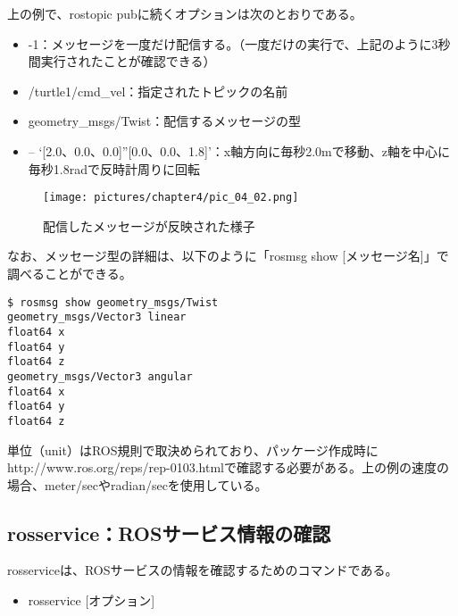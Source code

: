上の例で、rostopic pubに続くオプションは次のとおりである。

\begin{itemize}
\item -1：メッセージを一度だけ配信する。（一度だけの実行で、上記のように3秒間実行されたことが確認できる）
\item /turtle1/cmd\_vel：指定されたトピックの名前
\item geometry\_msgs/Twist：配信するメッセージの型
\item -- ‘[2.0、0.0、0.0]''[0.0、0.0、1.8]’：x軸方向に毎秒2.0mで移動、z軸を中心に毎秒1.8radで反時計周りに回転
\end{itemize}

\begin{figure}[h]
  \centering
  \texttt{[image: pictures/chapter4/pic\_04\_02.png]}
  \caption{配信したメッセージが反映された様子}
\end{figure}

なお、メッセージ型の詳細は、以下のように「rosmsg show [メッセージ名]」で調べることができる。

\begin{lstlisting}[language=ROS]
$ rosmsg show geometry_msgs/Twist
geometry_msgs/Vector3 linear
float64 x
float64 y
float64 z
geometry_msgs/Vector3 angular
float64 x
float64 y
float64 z
\end{lstlisting}

\begin{exercise}[ROSで使用される単位]
単位（unit）はROS規則で取決められており、パッケージ作成時にhttp://www.ros.org/reps/rep-0103.htmlで確認する必要がある。上の例の速度の場合、meter/secやradian/secを使用している。
\end{exercise}


\subsection{rosservice：ROSサービス情報の確認}

rosserviceは、ROSサービスの情報を確認するためのコマンドである。\\

\begin{itemize}
\item rosservice [オプション]\\
\end{itemize}

